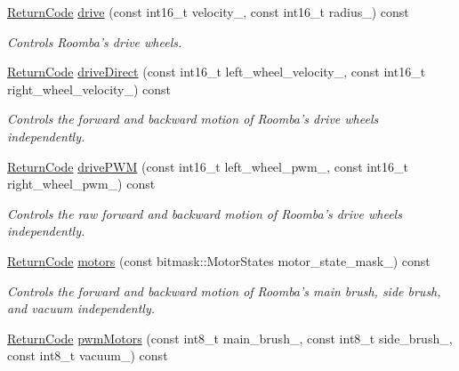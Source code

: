 \begin{DoxyCompactItemize}
\hyperlink{classroomba_1_1series500_1_1oi_1_1_o_i_encoder_ac2c8ad2f0306050926f89882d74696cc}{Return\+Code} \hyperlink{classroomba_1_1series500_1_1oi_1_1_o_i_encoder_aea532d32e746df738e58e8ccdb74cf0c}{drive} (const int16\+\_\+t velocity\+\_\+, const int16\+\_\+t radius\+\_\+) const 
\begin{DoxyCompactList}\small\item\em Controls Roomba’s drive wheels. \end{DoxyCompactList}\item 
\hyperlink{classroomba_1_1series500_1_1oi_1_1_o_i_encoder_ac2c8ad2f0306050926f89882d74696cc}{Return\+Code} \hyperlink{classroomba_1_1series500_1_1oi_1_1_o_i_encoder_acd959b32a171bbd588bd01d6799f3ec2}{drive\+Direct} (const int16\+\_\+t left\+\_\+wheel\+\_\+velocity\+\_\+, const int16\+\_\+t right\+\_\+wheel\+\_\+velocity\+\_\+) const 
\begin{DoxyCompactList}\small\item\em Controls the forward and backward motion of Roomba’s drive wheels independently. \end{DoxyCompactList}\item 
\hyperlink{classroomba_1_1series500_1_1oi_1_1_o_i_encoder_ac2c8ad2f0306050926f89882d74696cc}{Return\+Code} \hyperlink{classroomba_1_1series500_1_1oi_1_1_o_i_encoder_a4059279c20999fa10ff6b137f06c3ea6}{drive\+P\+W\+M} (const int16\+\_\+t left\+\_\+wheel\+\_\+pwm\+\_\+, const int16\+\_\+t right\+\_\+wheel\+\_\+pwm\+\_\+) const 
\begin{DoxyCompactList}\small\item\em Controls the raw forward and backward motion of Roomba’s drive wheels independently. \end{DoxyCompactList}\item 
\hyperlink{classroomba_1_1series500_1_1oi_1_1_o_i_encoder_ac2c8ad2f0306050926f89882d74696cc}{Return\+Code} \hyperlink{classroomba_1_1series500_1_1oi_1_1_o_i_encoder_a828609a0ba48ceb31d2ce674e69e4951}{motors} (const bitmask\+::\+Motor\+States motor\+\_\+state\+\_\+mask\+\_\+) const 
\begin{DoxyCompactList}\small\item\em Controls the forward and backward motion of Roomba’s main brush, side brush, and vacuum independently. \end{DoxyCompactList}\item 
\hyperlink{classroomba_1_1series500_1_1oi_1_1_o_i_encoder_ac2c8ad2f0306050926f89882d74696cc}{Return\+Code} \hyperlink{classroomba_1_1series500_1_1oi_1_1_o_i_encoder_aee910e2a71de7ecab2367cbfcd621fed}{pwm\+Motors} (const int8\+\_\+t main\+\_\+brush\+\_\+, const int8\+\_\+t side\+\_\+brush\+\_\+, const int8\+\_\+t vacuum\+\_\+) const 

\end{DoxyCompactItemize}
